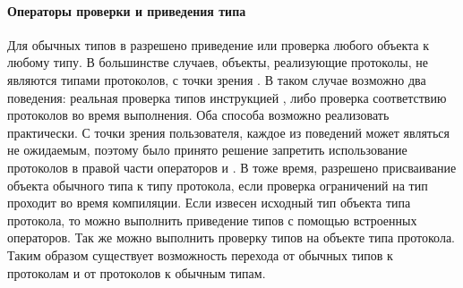 \paragraph{Операторы проверки и приведения типа}
Для обычных типов в  разрешено приведение или проверка любого объекта к любому типу. В большинстве случаев, объекты, реализующие протоколы, не являются типами протоколов, с точки зрения . В таком случае возможно два поведения: реальная проверка типов инструкцией , либо проверка соответствию протоколов во время выполнения. Оба способа возможно реализовать практически. С точки зрения пользователя, каждое из поведений может являться не ожидаемым, поэтому было принято решение запретить использование протоколов в правой части операторов  и . В тоже время, разрешено присваивание объекта обычного типа к типу протокола, если проверка ограничений на тип проходит во время компиляции. Если извесен исходный тип объекта типа протокола, то можно выполнить приведение типов с помощью встроенных операторов. Так же можно выполнить проверку типов на объекте типа протокола. Таким образом существует возможность перехода от обычных типов к протоколам и от протоколов к обычным типам.
